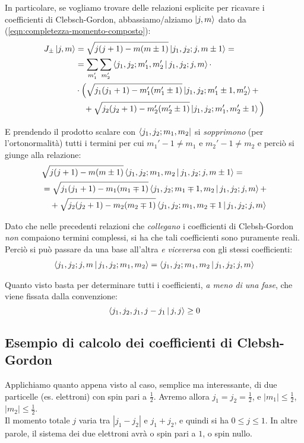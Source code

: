 \documentclass[../../FisicaTeorica.tex]{subfiles}
\begin{document}
In particolare, se vogliamo trovare delle relazioni esplicite per ricavare i coefficienti di Clebsch-Gordon, abbassiamo/alziamo $\Ket{j,m}$ dato da (\ref{eqn:completezza-momento-composto}):
\begin{align}\nonumber
J_{\pm}\Ket{j,m}&=\sqrt{j(j+1)-m(m\pm1)}\Ket{j_1, j_2; j, m\pm 1} =\\
&=\sum_{m_1'}\sum_{m_2'} \Braket{j_1, j_2;m_1',m_2'|j_1, j_2; j,m}\cdot\\ \nonumber
&\cdot \Big ( \sqrt{j_1(j_1+1)-m_1'(m_1'\pm1)}\Ket{j_1, j_2; m_1' \pm1, m_2'} +\\
&\quad +\sqrt{j_2(j_2+1)-m_2'(m_2'\pm1)}\Ket{j_1, j_2; m_1', m_2' \pm1}\Big)
\label{eqn:ricorsione_generale}
\end{align}

E prendendo il prodotto scalare con $\Bra{j_1, j_2; m_1, m_2}$ si \textit{sopprimono} (per l'ortonormalità) tutti i termini per cui $m_1'-1 \neq m_1$ e $m_2'-1\neq m_2$ e perciò si giunge alla relazione:
\begin{align}\nonumber
&\sqrt{j(j+1)-m(m\pm1)}\Braket{j_1, j_2; m_1, m_2|j_1, j_2; j, m \pm1} =\\ \nonumber
&= \sqrt{j_1(j_1+1)-m_1(m_1\mp1)}\Braket{j_1, j_2; m_1 \mp 1, m_2|j_1, j_2; j, m} +\\
&\quad+\sqrt{j_2(j_2+1)-m_2(m_2\mp1)}\Braket{j_1, j_2; m_1, m_2\mp1|j_1, j_2; j,m}
\label{eqn:recursione-coefficienti}
\end{align}

Dato che nelle precedenti relazioni che \textit{collegano} i coefficienti di Clebsh-Gordon \textit{non} compaiono termini complessi, si ha che tali coefficienti sono puramente reali. Perciò si può passare da una base all'altra \textit{e viceversa} con gli stessi coefficienti:
\begin{align*}
\Braket{j_1, j_2; j,m | j_1, j_2; m_1, m_2} = \Braket{j_1, j_2; m_1, m_2| j_1, j_2; j, m}
\end{align*}

Quanto visto basta per determinare tutti i coefficienti, \textit{a meno di una fase}, che viene fissata dalla convenzione:
\[
\Braket{j_1, j_2, j_1, j-j_1 | j ,j} \geq 0
\]

\subsection{Esempio di calcolo dei coefficienti di Clebsh-Gordon}
Applichiamo quanto appena visto al caso, semplice ma interessante, di due particelle (es. elettroni) con spin pari a $\frac{1}{2}$. Avremo allora $j_1 = j_2 = \frac{1}{2}$, e $|m_1|\leq \frac{1}{2}$, $|m_2|\leq \frac{1}{2}$.\\
Il momento totale $j$ varia tra $|j_1-j_2|$ e $j_1+j_2$, e quindi si ha $0\leq j \leq 1$. In altre parole, il sistema dei due elettroni avrà o spin pari a $1$, o spin nullo.\\
\end{document}
